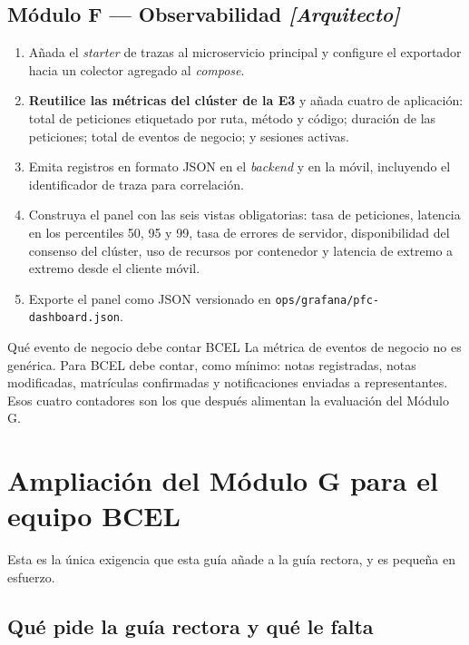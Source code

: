 \documentclass[11pt,a4paper]{article}
\begin{document}
\subsection{Módulo F --- Observabilidad \emph{[Arquitecto]}}

\begin{enumerate}[leftmargin=*,itemsep=3pt]
	\item Añada el \emph{starter} de trazas al microservicio principal y configure el exportador hacia un colector agregado al \emph{compose}.
	\item \textbf{Reutilice las métricas del clúster de la E3} y añada cuatro de aplicación: total de peticiones etiquetado por ruta, método y código; duración de las peticiones; total de eventos de negocio; y sesiones activas.
	\item Emita registros en formato JSON en el \emph{backend} y en la móvil, incluyendo el identificador de traza para correlación.
	\item Construya el panel con las seis vistas obligatorias: tasa de peticiones, latencia en los percentiles 50, 95 y 99, tasa de errores de servidor, disponibilidad del consenso del clúster, uso de recursos por contenedor y latencia de extremo a extremo desde el cliente móvil.
	\item Exporte el panel como JSON versionado en \texttt{ops/grafana/\allowbreak pfc-dashboard.json}.
\end{enumerate}

\begin{defBox}{Qué evento de negocio debe contar BCEL}
	La métrica de eventos de negocio no es genérica. Para BCEL debe contar, como mínimo: notas registradas, notas modificadas, matrículas confirmadas y notificaciones enviadas a representantes. Esos cuatro contadores son los que después alimentan la evaluación del Módulo G.
\end{defBox}

\section{Ampliación del Módulo G para el equipo BCEL}

Esta es la única exigencia que esta guía añade a la guía rectora, y es pequeña en esfuerzo.

\subsection{Qué pide la guía rectora y qué le falta}
\end{document}
